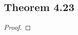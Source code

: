 \documentclass[../../main.tex]{subfiles}
\begin{document}
\subsection{Theorem 4.23}
\begin{wts}

\end{wts}
\begin{proof}

\end{proof}
\end{document}
